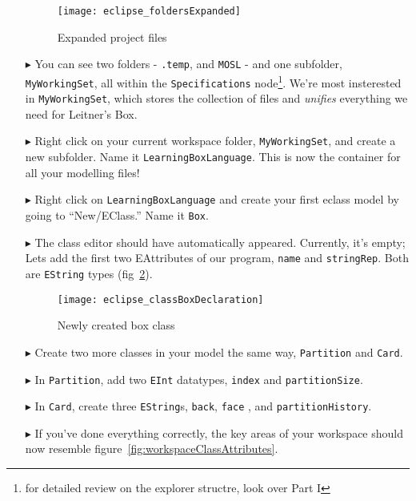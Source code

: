 \begin{itemize}
\begin{figure}[htbp]
	\centering
  \texttt{[image: eclipse\_foldersExpanded]}
	\caption{Expanded project files}
	\label{fig:expanded_folders}
\end{figure} 

\item[$\blacktriangleright$] You can see two folders - \texttt{.temp}, and \texttt{MOSL} - and one subfolder, \texttt{MyWorkingSet}, all within the \texttt{Specifications} node\footnote{for detailed review on the explorer structre, look over Part I}. We're most insterested in \texttt{MyWorkingSet}, which stores the collection of files and  \emph{unifies} everything we need for Leitner's Box. 

\item[$\blacktriangleright$] Right click on your current workspace folder, \texttt{MyWorkingSet}, and create a new subfolder. Name it \texttt{LearningBoxLanguage}. This is now the container for all your modelling files!


\item[$\blacktriangleright$] Right click on \texttt{LearningBoxLanguage} and create your first eclass model by going to ``New/EClass.'' Name it \texttt{Box}.

\item[$\blacktriangleright$] The class editor should have automatically appeared. Currently, it's empty; Lets add the first two EAttributes of our program, \texttt{name} and \texttt{stringRep}. Both are \texttt{EString} types (fig~\ref{fig:boxDeclaration}).

\begin{figure}[htbp]
	\centering
  \texttt{[image: eclipse\_classBoxDeclaration]}
	\caption{Newly created box class}
	\label{fig:boxDeclaration}
\end{figure} 

\item[$\blacktriangleright$] Create two more classes in your model the same way, \texttt{Partition} and \texttt{Card}. 

\item[$\blacktriangleright$] In \texttt{Partition}, add two \texttt{EInt} datatypes, \texttt{index} and \texttt{partitionSize}. 

\item[$\blacktriangleright$] In \texttt{Card}, create three \texttt{EString}s, \texttt{back}, \texttt{face} , and \texttt{partitionHistory}.

\item[$\blacktriangleright$] If you've done everything correctly, the key areas of your workspace should now resemble figure~\ref{fig:workspaceClassAttributes}.


\end{itemize}
